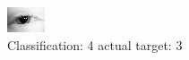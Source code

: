 \begin{figure}[h!]
\begin{center}
\includegraphics[width=0.60\columnwidth]{figures/ID128_class_4_target_3.png}
\end{center}
\caption{ Classification: 4 actual target: 3}
\label{fig:ID128_class_4_target_3}
\end{figure}
